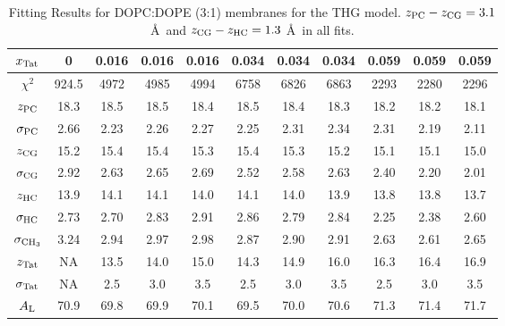 \begin{table}[htbp]
  \centering
  \begin{tabular}{c|c|ccc|ccc|ccc}
    \hline
    $x_\textrm{Tat}$ & 0 & 0.016 & 0.016 & 0.016 & 0.034 & 0.034 & 0.034 & 0.059 & 0.059 & 0.059 \\
    \hline
    $\chi^2$ & 924.5 & 4972 & 4985 & 4994 & 6758 & 6826 & 6863 & 2293 & 2280 & 2296 \\ 
    $z_\textrm{PC}$ & 18.3 & 18.5 & 18.5 & 18.4 & 18.5 & 18.4 & 18.3 & 18.2 & 18.2 & 18.1 \\
    $\sigma_\textrm{PC}$ & 2.66 & 2.23 & 2.26 & 2.27 & 2.25 & 2.31 & 2.34 & 2.31 & 2.19 & 2.11 \\
    $z_\textrm{CG}$ & 15.2 & 15.4 & 15.4 & 15.3 & 15.4 & 15.3 & 15.2 & 15.1 & 15.1 & 15.0 \\
    $\sigma_\textrm{CG}$ & 2.92 & 2.63 & 2.65 & 2.69 & 2.52 & 2.58 & 2.63 & 2.40 & 2.20 & 2.01 \\
    $z_\textrm{HC}$ & 13.9 & 14.1 & 14.1 & 14.0 & 14.1 & 14.0 & 13.9 & 13.8 & 13.8 & 13.7 \\
    $\sigma_\textrm{HC}$ & 2.73 & 2.70 & 2.83 & 2.91 & 2.86 & 2.79 & 2.84 & 2.25 & 2.38 & 2.60 \\
    $\sigma_{\textrm{CH}_3}$ & 3.24 & 2.94 & 2.97 & 2.98 & 2.87 & 2.90 & 2.91 & 2.63 & 2.61 & 2.65 \\
    $z_\textrm{Tat}$ & NA & 13.5 & 14.0 & 15.0 & 14.3 & 14.9 & 16.0 & 16.3 & 16.4 & 16.9 \\
    $\sigma_\textrm{Tat}$ & NA & 2.5 & 3.0 & 3.5 & 2.5 & 3.0 & 3.5 & 2.5 & 3.0 & 3.5 \\ 
    $A_\textrm{L}$ & 70.9 & 69.8 & 69.9 & 70.1 & 69.5 & 70.0 & 70.6 & 71.3 & 71.4 & 71.7 \\
    \hline
  \end{tabular}
  \caption{Fitting Results for DOPC:DOPE (3:1) membranes for the THG model. $z_\textrm{PC}-z_\textrm{CG} = 3.1$ \AA\
  and $z_\textrm{CG}-z_\textrm{HC} = 1.3$ \AA\ in all fits.}
  \label{tab:DOPCDOPE3to1_fit_results}
\end{table}

